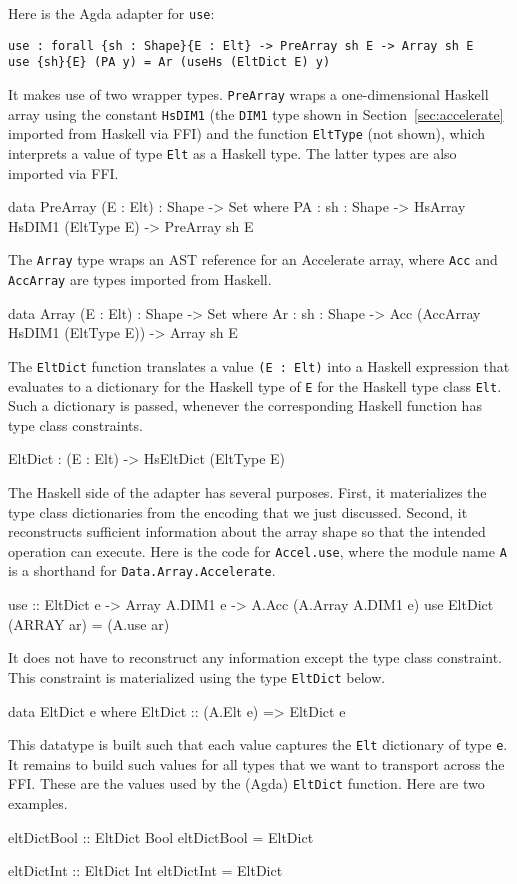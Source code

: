 \documentclass{llncs}
\begin{document}
Here is the Agda adapter for \texttt{use}:
\begin{verbatim}
use : forall {sh : Shape}{E : Elt} -> PreArray sh E -> Array sh E
use {sh}{E} (PA y) = Ar (useHs (EltDict E) y)
\end{verbatim}
It makes use of two wrapper types. \texttt{PreArray} wraps a
one-dimensional Haskell array using the constant \texttt{HsDIM1} (the
\texttt{DIM1} type shown in Section~\ref{sec:accelerate} imported from
Haskell via FFI) and the function \texttt{EltType} (not shown), which
interprets a value of type \texttt{Elt} as a Haskell type. The
latter types are also imported via FFI.
\begin{code}
data PreArray (E : Elt) : Shape -> Set where
  PA : {sh : Shape} -> HsArray HsDIM1 (EltType E) -> PreArray sh E
\end{code}
The \texttt{Array} type wraps an AST reference for an Accelerate
array, where \texttt{Acc} and \texttt{AccArray} are types imported
from Haskell.
\begin{code}
data Array (E : Elt) : Shape -> Set where
  Ar : {sh : Shape} -> Acc (AccArray HsDIM1 (EltType E)) -> Array sh E
\end{code}
The \texttt{EltDict} function translates a value 
\texttt{(E : Elt)} into a Haskell expression that evaluates to a
dictionary for the Haskell type of \texttt{E} for the Haskell type
class \texttt{Elt}. Such a dictionary is passed, whenever the
corresponding Haskell function has type class constraints.
\begin{code}
EltDict : (E : Elt) -> HsEltDict (EltType E)
\end{code}

The Haskell side of the adapter has several purposes. First, it
materializes the type class dictionaries from the encoding that we
just discussed. Second, it reconstructs sufficient information about
the array shape so that the intended operation can execute. Here is
the code for \texttt{Accel.use}, where the module name \texttt{A}
is a shorthand for \texttt{Data.Array.Accelerate}.
\begin{hcode}
use :: EltDict e -> Array A.DIM1 e -> A.Acc (A.Array A.DIM1 e)
use EltDict (ARRAY ar) = (A.use ar)
\end{hcode}
It does not have to reconstruct any information except the type class
constraint. This constraint is materialized using the type
\texttt{EltDict} below.
\begin{hcode}
data EltDict e where
  EltDict :: (A.Elt e) => EltDict e
\end{hcode}
This datatype is built such that each value captures the \texttt{Elt}
dictionary of type \texttt{e}. It remains to build such values for all
types that we want to transport across the FFI. These are the values
used by the (Agda) \texttt{EltDict} function. Here are two examples.
\begin{hcode}
eltDictBool :: EltDict Bool
eltDictBool = EltDict

eltDictInt :: EltDict Int
eltDictInt = EltDict
\end{hcode}
\end{document}
